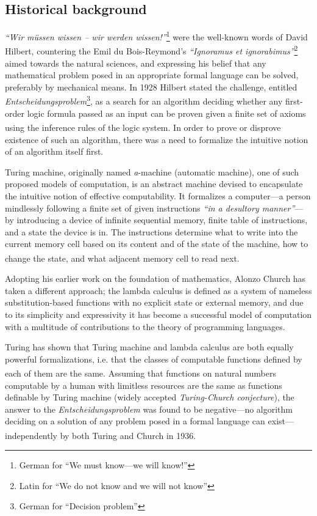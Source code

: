 \documentclass[table, a4paper, 10pt]{article}
\newcommand{\cit}[1]{\textsuperscript{\cite{#1}}}
\newcommand{\footnoteafterquote}[1]{\hspace{0.05cm}\footnote{#1}}
\begin{document}
\subsection{Historical background}
\textit{``Wir müssen wissen -- wir werden wissen!''}\footnoteafterquote{German for ``We must know---we will know!''}
were the well-known words of David Hilbert,
countering the Emil du Bois-Reymond's
\textit{``Ignoramus et ignorabimus''}\footnoteafterquote{Latin for ``We do not know and we will not know''}
aimed towards the natural sciences, and expressing his belief that any mathematical
problem posed in an appropriate formal language
can be solved, preferably by mechanical means. 
In 1928 Hilbert stated the challenge,
entitled \textit{Entscheidungsproblem}\footnote{German for ``Decision problem''},
as a search for an algorithm deciding whether any
first-order logic formula passed as an input
can be proven given a finite set of axioms using the inference rules of the logic system.\cit{hilbert}
In order to prove or disprove existence of
such an algorithm, there was a need to
formalize the intuitive notion of an algorithm itself first.

Turing machine, originally named \textit{a}-machine (automatic machine), one of such proposed
models of computation, is an abstract machine devised
to encapsulate the intuitive notion of effective computability. It formalizes
a computer---a person mindlessly following a finite set of given
instructions \textit{``in a desultory manner''}---by introducing
a device of infinite sequential memory, finite table of instructions, and
a state the device is in. The instructions determine what to write into the
current memory cell based on its content and of the state of the machine,
how to change the state, and what adjacent memory cell to read next.\cit{turingPaper}

Adopting his earlier work on the foundation of mathematics, Alonzo Church
has taken a different approach; the lambda calculus is defined
as a system of nameless substitution-based functions with no explicit state or external memory,
and due to its simplicity and expressivity it has become a successful model of computation
with a multitude of contributions to the theory of programming languages.
 
Turing has shown that Turing machine and lambda calculus are both equally powerful formalizations, i.e. that
the classes of computable functions defined by each of them are the same.\cit{turingDefin}
Assuming that functions on natural numbers computable by a human
with limitless resources are the same as functions definable by Turing machine (widely accepted \textit{Turing-Church conjecture}),
the answer to the \textit{Entscheidungsproblem} was found to be negative---no algorithm deciding on a
solution of any problem posed in a formal language can exist---independently by both Turing and Church
in 1936.\cit{turingPaper, churchPaper}
\end{document}
